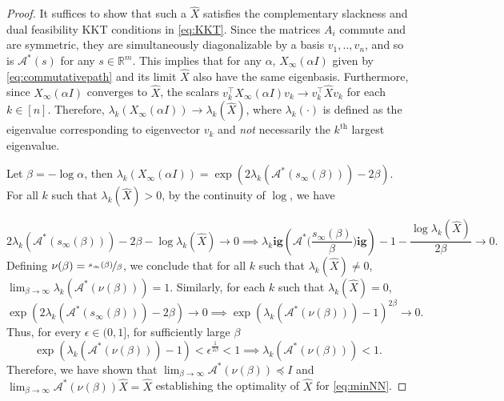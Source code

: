 \begin{proof}
It suffices to show that such a $\widehat{X}$ satisfies the complementary slackness and dual feasibility KKT conditions in \eqref{eq:KKT}.
Since the matrices $A_i$ commute and are symmetric, they are simultaneously diagonalizable by a basis $v_1,..,v_n$, and so is $\mathcal{A}^*(s)$ for any $s \in \mathbb{R}^m$. This implies that for any $
\alpha$, $X_\infty(\alpha I)$ given by \eqref{eq:commutativepath} and its limit $\widehat{X}$ also have the same eigenbasis. Furthermore, since $X_\infty(\alpha I)$ converges to $\widehat{X}$, the scalars $v_k^\top X_\infty(\alpha I) v_k \to v_k^\top \widehat{X} v_k$ for each $k \in [n]$. Therefore, $\lambda_k(X_\infty(\alpha I)) \to \lambda_k(\widehat{X})$, where $\lambda_k(\cdot)$ is defined as the eigenvalue corresponding to eigenvector $v_k$ and \emph{not} necessarily the $k^{\textrm{th}}$ largest eigenvalue.

Let $\beta = -\log \alpha$, then $\lambda_k(X_\infty(\alpha I)) = \exp(2\lambda_k(\mathcal{A}^*(s_\infty(\beta))) - 2\beta)$. For all $k$ such that $\lambda_k(\widehat{X}) > 0$, by the continuity of $\log$, we have 

\begin{equation}
2\lambda_k(\mathcal{A}^*(s_\infty(\beta))) - 2\beta - \log \lambda_k(\widehat{X}) \to 0 \implies \lambda_k\mathbf{ig}(\mathcal{A}^*\big(\frac{s_\infty(\beta)}{\beta}\big)\mathbf{ig}) - 1 - \frac{\log \lambda_k(\widehat{X})}{2\beta} \to 0.
\end{equation}
Defining $\nu(\beta) = \nicefrac{s_\infty(\beta)}{\beta}$, we conclude that for all $k$ such that $\lambda_k(\widehat{X})\neq0$,  $\lim_{\beta\to\infty}\lambda_k(\mathcal{A}^*(\nu(\beta))) = 1$. Similarly, for each $k$ such that $\lambda_k(\widehat{X}) = 0$,
\begin{equation}
\exp(2\lambda_k(\mathcal{A}^*(s_\infty(\beta))) - 2\beta) \to 0 \implies \exp(\lambda_k(\mathcal{A}^*(\nu(\beta))) - 1)^{2\beta} \to 0.
\end{equation}
Thus, for every $\epsilon\in(0,1]$, for sufficiently large $\beta$
\begin{equation}
\exp(\lambda_k(\mathcal{A}^*(\nu(\beta))) - 1) < \epsilon^{\frac{1}{2\beta}} < 1 \implies \lambda_k(\mathcal{A}^*(\nu(\beta))) < 1.
\end{equation}
Therefore, we have shown that $\lim_{\beta\to\infty} \mathcal{A}^*(\nu(\beta)) \preceq I$ and $\lim_{\beta\to\infty} \mathcal{A}^*(\nu(\beta))\widehat{X} = \widehat{X}$ establishing the optimality of $\widehat{X}$ for \eqref{eq:minNN}.
\end{proof}

